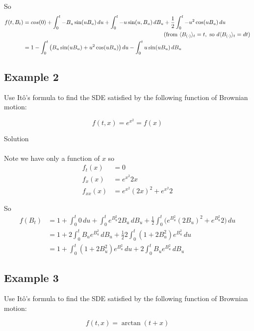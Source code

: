 \documentclass[12pt]{article}
\begin{document}
So
\begin{align*}
	f(t,B_t) &= cos(0) + \int^t_0 -B_u\sin(uB_u)\,du + \int^t_0 -u\sin(u,B_u)\,dB_u + \frac{1}{2}\int^t_0 -u^2\cos(uB_u)\,du \\
	&\hphantom{{} = cos(0) + \int^t_0 -B_u\sin(uB_u)\,du + \int^t_0 -u\sin(u,B_u)\,dB_u}\text{(from } \langle B_{(\cdot)} \rangle_t = t, \text{ so } d\langle B_{(\cdot)} \rangle_t = dt) \\
	&= 1 - \int^t_0 \big(B_u\sin(uB_u) + u^2\cos(uB_u)\big)\,du - \int^t_0 u\sin(uB_u)\,dB_u
\end{align*}

\subsection{Example 2}

Use It\^{o}'s formula to find the SDE satisfied by the following function of Brownian motion:

\begin{equation*}
	f(t,x) = e^{x^2} = f(x)
\end{equation*}

Solution \\
\\
Note we have only a function of $x$ so 
\begin{align*}
	f_t(x) &= 0 \\
	f_x(x) &= e^{x^2}2x \\
	f_{xx}(x) &= e^{x^2}(2x)^2 + e^{x^2}2
\end{align*}

So
\begin{align*}
	f(B_t) &= 1 + \int^t_0 0\,du + \int^t_0 e^{B_u^2}2B_u\,dB_u + \frac{1}{2}\int^t_0\big(e^{B_u^2}(2B_u)^2 + e^{B_u^2}2\big)\,du \\
	&= 1 + 2\int^t_0 B_ue^{B_u^2}\,dB_u + \frac{1}{2}2\int^t_0 (1 + 2B_u^2)e^{B_u^2}\,du \\
	&= 1 + \int^t_0 (1 + 2B_u^2)e^{B_u^2}\,du  + 2\int^t_0 B_ue^{B_u^2}\,dB_u
\end{align*}

\subsection{Example 3}

Use It\^{o}'s formula to find the SDE satisfied by the following function of Brownian motion:

\begin{equation*}
	f(t,x) = \arctan(t + x)
\end{equation*}
\end{document}
